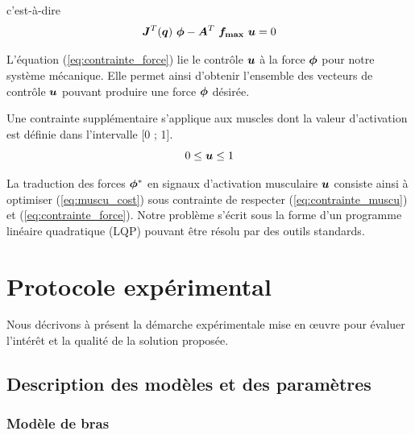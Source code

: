 \documentclass[pdftex,a4paper,11pt]{article}
\begin{document}
c'est-à-dire 
\begin{equation}
  \boldsymbol{J}^T(\boldsymbol{q}) ~ \boldsymbol{\phi} - \boldsymbol{A}^T ~ \boldsymbol{f_{\max}} ~ \boldsymbol{u} = 0
\label{eq:contrainte_force}
\end{equation}

L'équation (\ref{eq:contrainte_force}) lie le contrôle $\boldsymbol{u}$ à la force
$\boldsymbol{\phi}$ pour notre système mé\-ca\-nique.
Elle permet ainsi d'obtenir l'ensemble des vecteurs de contrôle $\boldsymbol{u}$
pouvant produire une force $\boldsymbol{\phi}$ désirée.

Une contrainte supplémentaire s'applique aux muscles dont la valeur
d'activation est définie dans l'intervalle [0 ; 1].
\begin{equation}
  0  \leq \boldsymbol{u} \leq 1
\label{eq:contrainte_muscu}
\end{equation}

La traduction des forces $\boldsymbol{\phi}^*$ en signaux d'activation musculaire $\boldsymbol{u}$
consiste ainsi à optimiser (\ref{eq:muscu_cost}) sous contrainte de respecter
(\ref{eq:contrainte_muscu}) et (\ref{eq:contrainte_force}). Notre problème
s'écrit sous la forme d'un programme linéaire quadratique (LQP) pouvant être
résolu par des outils standards.


\section{Protocole expérimental}
\label{sec:expe}

Nous décrivons à présent la démarche expérimentale mise en œuvre pour évaluer
l'intérêt et la qualité de la solution proposée.


\subsection{Description des modèles et des paramètres}
\label{sec:desc}


\subsubsection{Modèle de bras}
\end{document}
